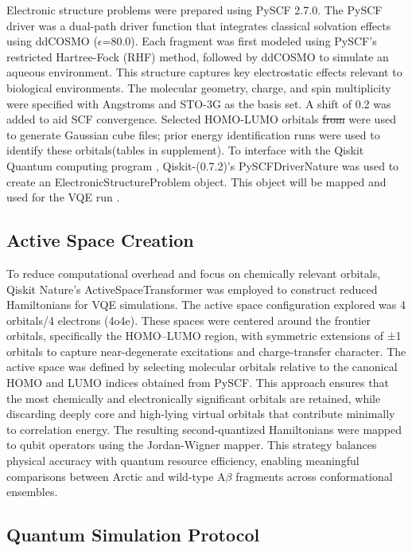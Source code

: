 \documentclass[%
 reprint,
 amsmath,amssymb,
 aps,
]{revtex4-2}
\begin{document}
 Electronic structure problems were prepared using PySCF 2.7.0. The PySCF driver was a dual-path driver function that integrates classical solvation effects using ddCOSMO ($\epsilon$=80.0). Each fragment was first modeled using PySCF’s restricted Hartree-Fock (RHF) method, followed by ddCOSMO to simulate an aqueous environment. This structure captures key electrostatic effects relevant to biological environments. The molecular geometry, charge, and spin multiplicity were specified with Angstroms and STO-3G as the basis set. A shift of 0.2 was added to aid SCF convergence. Selected HOMO-LUMO orbitals \st{from} were used to generate Gaussian cube files; prior energy identification runs were used to identify these orbitals(tables in supplement). To interface with the Qiskit Quantum computing program \cite{qiskit2019,qiskit_nature2021}, Qiskit-(0.7.2)’s PySCFDriverNature\cite{pyscf2020} was used to create an ElectronicStructureProblem object. This object will be mapped and used for the VQE run \cite{peruzzo2014}.

\subsection{Active Space Creation}
 
To reduce computational overhead and focus on chemically relevant orbitals, Qiskit Nature’s ActiveSpaceTransformer was employed to construct reduced Hamiltonians for VQE simulations.  The active space configuration  \cite{active_space} explored was 4 orbitals/4 electrons (4o4e). These spaces were centered around the frontier orbitals, specifically the HOMO–LUMO region, with symmetric extensions of ±1 orbitals to capture near-degenerate excitations and charge-transfer character.
The active space was defined by selecting molecular orbitals relative to the canonical HOMO and LUMO indices obtained from PySCF. This approach ensures that the most chemically and electronically significant orbitals are retained, while discarding deeply core and high-lying virtual orbitals that contribute minimally to correlation energy. The resulting second-quantized Hamiltonians were mapped to qubit operators using the Jordan-Wigner mapper. This strategy balances physical accuracy with quantum resource efficiency, enabling meaningful comparisons between Arctic and wild-type A$\beta$ fragments across conformational ensembles.

\subsection{Quantum Simulation Protocol}
\end{document}
